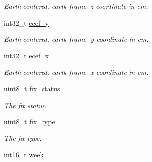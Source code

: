 \begin{DoxyCompactItemize}
\begin{DoxyCompactList}\small\item\em Earth centered, earth frame, z coordinate in cm. \end{DoxyCompactList}\item 
\hypertarget{structubx__nav__solution__t_aa85767721cab1c13584ba9cae65f4272}{int32\+\_\+t \hyperlink{structubx__nav__solution__t_aa85767721cab1c13584ba9cae65f4272}{ecef\+\_\+y}}\label{structubx__nav__solution__t_aa85767721cab1c13584ba9cae65f4272}

\begin{DoxyCompactList}\small\item\em Earth centered, earth frame, y coordinate in cm. \end{DoxyCompactList}\item 
\hypertarget{structubx__nav__solution__t_a245619ffd00287c3fc4b2a66593a0d02}{int32\+\_\+t \hyperlink{structubx__nav__solution__t_a245619ffd00287c3fc4b2a66593a0d02}{ecef\+\_\+x}}\label{structubx__nav__solution__t_a245619ffd00287c3fc4b2a66593a0d02}

\begin{DoxyCompactList}\small\item\em Earth centered, earth frame, x coordinate in cm. \end{DoxyCompactList}\item 
\hypertarget{structubx__nav__solution__t_a3323adfc93d30f1362698ecc03288ccd}{uint8\+\_\+t \hyperlink{structubx__nav__solution__t_a3323adfc93d30f1362698ecc03288ccd}{fix\+\_\+status}}\label{structubx__nav__solution__t_a3323adfc93d30f1362698ecc03288ccd}

\begin{DoxyCompactList}\small\item\em The fix status. \end{DoxyCompactList}\item 
\hypertarget{structubx__nav__solution__t_ae5eaee686cf166fd3ce7a747709a205e}{uint8\+\_\+t \hyperlink{structubx__nav__solution__t_ae5eaee686cf166fd3ce7a747709a205e}{fix\+\_\+type}}\label{structubx__nav__solution__t_ae5eaee686cf166fd3ce7a747709a205e}

\begin{DoxyCompactList}\small\item\em The fix type. \end{DoxyCompactList}\item 
\hypertarget{structubx__nav__solution__t_a5ecd80df74ccec2c61041adfa564d1db}{int16\+\_\+t \hyperlink{structubx__nav__solution__t_a5ecd80df74ccec2c61041adfa564d1db}{week}}\label{structubx__nav__solution__t_a5ecd80df74ccec2c61041adfa564d1db}


\end{DoxyCompactItemize}
